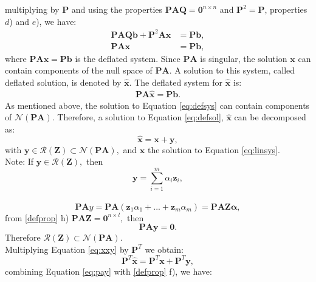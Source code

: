 \documentclass{ecmorXV}
\begin{document}
multiplying by $\mathbf{P}$ and using the properties $\mathbf{P}\mathbf{A}\mathbf{Q}=
\mathbf{0}^{n\times n}$ and $\mathbf{P}^2=\mathbf{P}$, properties $d$) and $e$), we have:
\begin{align}\label{eq:defsys}
\mathbf{P}\mathbf{A}\mathbf{Q}\mathbf{b}+\mathbf{P}^2\mathbf{A}\mathbf{x}&=\mathbf{P}\mathbf{b},\nonumber \\
\mathbf{P}\mathbf{A}\mathbf{x}&=\mathbf{P}\mathbf{b},
\end{align}
where $\mathbf{P}\mathbf{A}\mathbf{x}=\mathbf{P}\mathbf{b}$ is the deflated system. Since 
$\mathbf{P}\mathbf{A}$ is singular, the solution $\mathbf{x}$ can contain
components of the null space of $\mathbf{P}\mathbf{A}$. A solution to this system, called deflated
solution, is denoted by $\mathbf{\hat{x}}$.
The deflated system for $\mathbf{\hat{x}}$ is:
\begin{align}\label{eq:defsol}
\mathbf{P}\mathbf{A} \hat{\mathbf{x}}=\mathbf{P}\mathbf{b}.
\end{align}
As mentioned above, the solution to Equation \eqref{eq:defsys} can contain components of 
$\mathcal{N}(\mathbf{P}\mathbf{A})$. Therefore, a solution to Equation \eqref{eq:defsol},
$\mathbf{\hat{x}}$ can be decomposed as:
\begin{equation}\label{eq:xxy}
\mathbf{\hat{x}}=\mathbf{x}+ \mathbf{y},
\end{equation}
with $\mathbf{y} \in \mathcal{R}(\mathbf{Z})\subset \mathcal{N}(\mathbf{P}\mathbf{A}),$ 
and $\mathbf{x}$ the solution to Equation \eqref{eq:linsys}.\\
Note: If $\mathbf{y} \in \mathcal{R}(\mathbf{Z}),$ then $$\mathbf{y}=\sum^{m}_{i=1}\alpha_i \mathbf{z}_i,$$\\
 \begin{equation}\label{eq:paz}
 \mathbf{P}\mathbf{A}y=\mathbf{P}\mathbf{A}(\mathbf{z}_1\alpha_1 +...+ \mathbf{z}_m\alpha_m)=\mathbf{P}\mathbf{A}\mathbf{Z}\mathbf{\alpha},\end{equation}
 from \ref{defprop} h) $\mathbf{P}\mathbf{A}\mathbf{Z}=\mathbf{0}^{n\times l},$ then 
 \begin{equation}\label{eq:pay}
 \mathbf{P}\mathbf{A}\mathbf{y}=\mathbf{0}.
 \end{equation}
Therefore $\mathcal{R}(\mathbf{Z})\subset \mathcal{N}(\mathbf{P}\mathbf{A}).$ \\
Multiplying Equation \eqref{eq:xxy} by $\mathbf{P}^T$ we obtain:
$$\mathbf{P}^T\mathbf{\hat{x}}=\mathbf{P}^T\mathbf{x}+\mathbf{P}^T\mathbf{y},$$
combining Equation \eqref{eq:pay} with \ref{defprop} f), we have:
\end{document}
